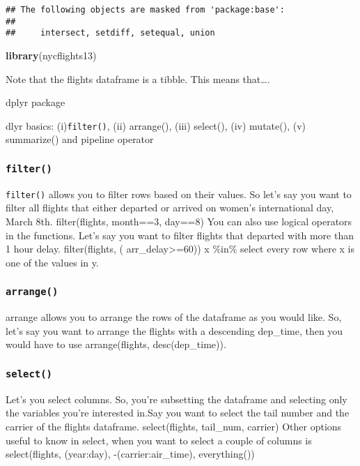 \documentclass[
]{article}
\newenvironment{Shaded}{\begin{snugshade}}{\end{snugshade}}
\newcommand{\KeywordTok}[1]{\textcolor[rgb]{0.13,0.29,0.53}{\textbf{#1}}}
\newcommand{\NormalTok}[1]{#1}
\begin{document}
\begin{verbatim}
## The following objects are masked from 'package:base':
## 
##     intersect, setdiff, setequal, union
\end{verbatim}

\begin{Shaded}
\begin{Highlighting}[]
\KeywordTok{library}\NormalTok{(nycflights13)}
\end{Highlighting}
\end{Shaded}

Note that the flights dataframe is a tibble. This means that\ldots.

dplyr package

dlyr basics: (i)\texttt{filter()}, (ii) arrange(), (iii) select(), (iv)
mutate(), (v) summarize() and pipeline operator

\hypertarget{filter}{%
\subsubsection{\texorpdfstring{\texttt{filter()}}{filter()}}\label{filter}}

\texttt{filter()} allows you to filter rows based on their values. So
let's say you want to filter all flights that either departed or arrived
on women's international day, March 8th. filter(flights, month==3,
day==8) You can also use logical operators in the functions. Let's say
you want to filter flights that departed with more than 1 hour delay.
filter(flights, ( arr\_delay\textgreater=60)) x \%in\% select every row
where x is one of the values in y.

\hypertarget{arrange}{%
\subsubsection{\texorpdfstring{\texttt{arrange()}}{arrange()}}\label{arrange}}

arrange allows you to arrange the rows of the dataframe as you would
like. So, let's say you want to arrange the flights with a descending
dep\_time, then you would have to use arrange(flights, desc(dep\_time)).

\hypertarget{select}{%
\subsubsection{\texorpdfstring{\texttt{select()}}{select()}}\label{select}}

Let's you select columns. So, you're subsetting the dataframe and
selecting only the variables you're interested in.Say you want to select
the tail number and the carrier of the flights dataframe.
select(flights, tail\_num, carrier) Other options useful to know in
select, when you want to select a couple of columns is select(flights,
(year:day), -(carrier:air\_time), everything())
\end{document}
